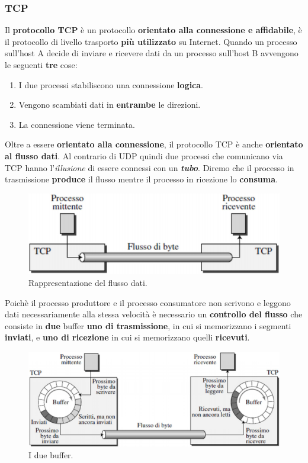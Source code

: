 \documentclass[11pt,a4paper]{article}
\theoremstyle{definition}
\begin{document}
\subsubsection{TCP}
\label{sec:TCP}
Il \textbf{protocollo TCP} è un protocollo \textbf{orientato alla connessione e affidabile}, è il protocollo di livello trasporto \textbf{più utilizzato} su Internet.
Quando un processo sull'host A decide di inviare e ricevere dati da un processo sull'host B avvengono le seguenti \textbf{tre} cose:
\begin{enumerate}
	\item I due processi stabiliscono una connessione \textbf{logica}.
	\item Vengono scambiati dati in \textbf{entrambe} le direzioni.
	\item La connessione viene terminata.
\end{enumerate}
Oltre a essere \textbf{orientato alla connessione}, il protocollo TCP è anche \textbf{orientato al flusso dati}. Al contrario di UDP quindi due processi che comunicano via TCP hanno l'\textit{illusione} di essere connessi con un \textit{\textbf{tubo}}. Diremo che il processo in trasmissione \textbf{produce} il flusso
mentre il processo in ricezione lo \textbf{consuma}.
\begin{figure}[!h]
	\includegraphics[scale=0.5]{Immagini/TCP_flow.png}
	\centering
	\caption{Rappresentazione del flusso dati.}
\end{figure}\newline
Poichè il processo produttore e il processo consumatore non scrivono e leggono dati necessariamente alla stessa velocità è necessario un \textbf{controllo del flusso} che consiste in \textbf{due} buffer \textbf{uno di trasmissione}, in cui si memorizzano i segmenti \textbf{inviati}, e \textbf{uno di ricezione} in cui si memorizzano quelli \textbf{ricevuti}.
\begin{figure}[!h]
	\includegraphics[scale=0.5]{Immagini/TCP_buffers.png}
	\centering
	\caption{I due buffer.}
\end{figure}\newline
\end{document}
